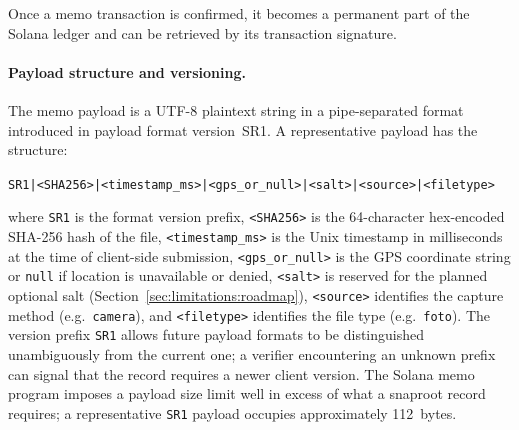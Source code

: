 \documentclass[11pt,a4paper]{article}
\begin{document}
Once a memo transaction is confirmed, it becomes a permanent part of
the Solana ledger and can be retrieved by its transaction signature.

\paragraph{Payload structure and versioning.}\label{sec:architecture:payload} The memo payload is a
UTF-8 plaintext string in a pipe-separated format introduced in
payload format version~SR1. A representative payload has the
structure:
\begin{center}
\texttt{SR1|<SHA256>|<timestamp\_ms>|<gps\_or\_null>|<salt>|<source>|<filetype>}
\end{center}
where \texttt{SR1} is the format version prefix, \texttt{<SHA256>}
is the 64-character hex-encoded SHA-256 hash of the file,
\texttt{<timestamp\_ms>} is the Unix timestamp in milliseconds at
the time of client-side submission, \texttt{<gps\_or\_null>} is the
GPS coordinate string or \texttt{null} if location is unavailable or
denied, \texttt{<salt>} is reserved for the planned optional salt
(Section~\ref{sec:limitations:roadmap}), \texttt{<source>} identifies
the capture method (e.g.\ \texttt{camera}), and \texttt{<filetype>}
identifies the file type (e.g.\ \texttt{foto}). The version prefix
\texttt{SR1} allows future payload formats to be distinguished
unambiguously from the current one; a verifier encountering an
unknown prefix can signal that the record requires a newer client
version. The Solana memo program imposes a payload size limit well in
excess of what a snaproot record requires; a representative
\texttt{SR1} payload occupies approximately 112~bytes.
\end{document}
